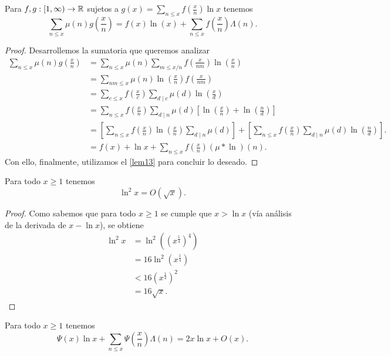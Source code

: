 \begin{lemma}\label{lem15}
Para $f, g : [1, \infty) \to \mathbb{R}$ sujetos a  $g(x) = \sum_{n \leq x} f\left(\frac{x}{n}\right) \ln x$ tenemos
\[
\sum_{n \leq x} \mu(n) g\left(\frac{x}{n}\right) = f(x) \ln(x) + \sum_{n \leq x} f\left(\frac{x}{n}\right) \Lambda(n).
\]
\end{lemma}
\begin{proof}
Desarrollemos la sumatoria que queremos analizar
\begin{align}
\sum_{n \leq x} \mu(n) g\left(\frac{x}{n}\right) &= \sum_{n \leq x} \mu(n) \sum_{m \leq x/n} f\left(\frac{x}{nm}\right) \ln \left(\frac{x}{n}\right) \\
&= \sum_{nm \leq x} \mu(n) \ln\left(\frac{x}{n}\right) f \left(\frac{x}{nm}\right) \\    
&= \sum_{c \leq x} f\left(\frac{x}{c}\right) \sum_{d \mid c} \mu(d) \ln\left(\frac{x}{d}\right) \\
&= \sum_{n \leq x} f\left(\frac{x}{n}\right) \sum_{d \mid n} \mu(d) \left[\ln \left(\frac{x}{n}\right) + \ln\left(\frac{n}{d}\right)\right] \\
&= \left[\sum_{n \leq x} f\left(\frac{x}{n}\right) \ln\left(\frac{x}{n}\right) \sum_{d \mid n} \mu(d)\right]
+  \left[\sum_{n \leq x} f\left(\frac{x}{n}\right) \sum_{d \mid n} \mu(d) \ln\left(\frac{n}{d}\right)\right].\\
&= f(x) +  \ln{x} +  \sum_{n \leq x} f\left(\frac{x}{n}\right) (\mu * \ln)(n). 
\end{align}
Con ello, finalmente, 
utilizamos el \cref{lem13} para concluir lo deseado. 
\end{proof}

\begin{lemma}\label{lem16}
Para todo $x \geq 1$ tenemos
\[
\ln^2 x = O(\sqrt{x}).
\]
\end{lemma}

\begin{proof}
Como sabemos que para todo $x \geq 1$ se cumple que $x > \ln x$ (v\'ia an\'alisis de la  derivada de $x - \ln x$), 
se obtiene
\begin{align}
\ln^2 x &= \ln^2 ((x ^ {\frac{1}{4}}) ^ 4) \\
&= 16 \ln^2 (x ^ {\frac{1}{4}}) \\
&< 16 (x ^ {\frac{1}{4}}) ^ 2 \\
&= 16 \sqrt{x}.
\end{align}
\end{proof}

\begin{lemma}\label{lem17}
Para todo $x \geq 1$ tenemos
$$\Psi(x) \ln x + \sum_{n \leq x} \Psi\left(\frac{x}{n}\right)\Lambda(n) = 2x\ln x + O(x).$$
\end{lemma}

